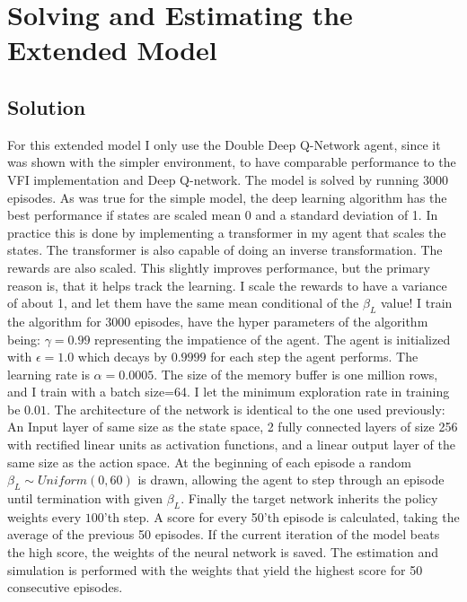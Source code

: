 \section{Solving and Estimating the Extended Model}

\subsection{Solution}

For this extended model I only use the Double Deep Q-Network agent, since it was shown with the simpler environment, to have comparable performance to the VFI implementation and Deep Q-network. The model is solved by running 3000 episodes. As was true for the simple model, the deep learning algorithm has the best performance if states are scaled mean 0 and a standard deviation of 1. In practice this is done by implementing a transformer in my agent that scales the states.  The transformer is also capable of doing an inverse transformation. The rewards are also scaled. This slightly improves performance, but the primary reason is, that it helps track the learning. I scale the rewards to have a variance of about 1, and let them have the same mean conditional of the $\beta_L$  value! I train the algorithm for 3000 episodes, have the hyper parameters of the algorithm being: $\gamma=0.99$ representing the impatience of the agent. The agent is initialized with $\epsilon=1.0$ which decays by $0.9999$ for each step the agent performs. The learning rate is $\alpha=0.0005$. The size of the memory buffer is one million rows, and I train with a batch size=64. I let the minimum exploration rate in training be $0.01$.  The architecture of the network is identical to the one used previously: An Input layer of same size as the state space, 2 fully connected layers of size 256 with rectified linear units as activation functions, and a linear output layer of the same size as the action space. At the beginning of each episode a random $\beta_L \sim Uniform(0, 60)$ is drawn, allowing the agent to step through an episode until termination with given $\beta_L$. Finally the target network inherits the policy weights every $100$'th step. A score for every 50'th episode is calculated, taking the average of the previous 50 episodes. If the current iteration of the model beats the high score, the weights of the neural network is saved. The estimation and simulation is performed with the weights that yield the highest score for 50 consecutive episodes. 

